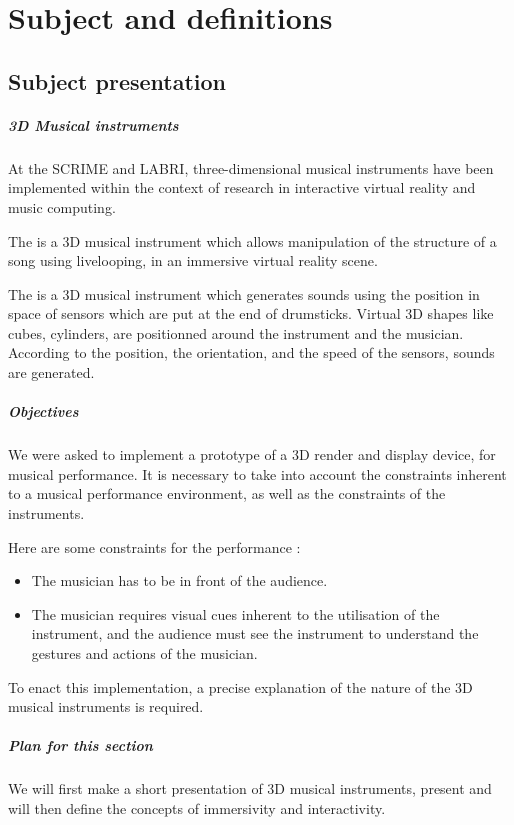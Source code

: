\chapter{Subject and definitions}
\section{Subject presentation}
\paragraph{3D Musical instruments}
At the \ac{SCRIME} and \ac{LABRI}, three-dimensional musical instruments have been implemented within the context of research in interactive virtual reality and music computing. 

The  \cite{berthaut2010drile} is a 3D musical instrument which allows manipulation of the structure of a song using \gls{livelooping}, in an immersive virtual reality scene.

The  is a 3D musical instrument which generates sounds using the position in space of sensors which are put at the end of drumsticks. Virtual 3D shapes like cubes, cylinders, are positionned around the instrument and the musician. According to the position, the orientation, and the speed of the sensors, sounds are generated.

\paragraph{Objectives}
We were asked to implement a prototype of a 3D render and display device, for musical performance.
It is necessary to take into account the constraints inherent to a musical performance environment, as well as the constraints of the instruments.

Here are some constraints for the performance : 
\begin{itemize}
\item The musician has to be in front of the audience.
\item The musician requires visual cues inherent to the utilisation of the instrument, and the audience must see the instrument to understand the gestures and actions of the musician.
\end{itemize}

To enact this implementation, a precise explanation of the nature of the 3D musical instruments is required.

\paragraph{Plan for this section}
We will first make a short presentation of 3D musical instruments, present and will then define the concepts of immersivity and interactivity.

